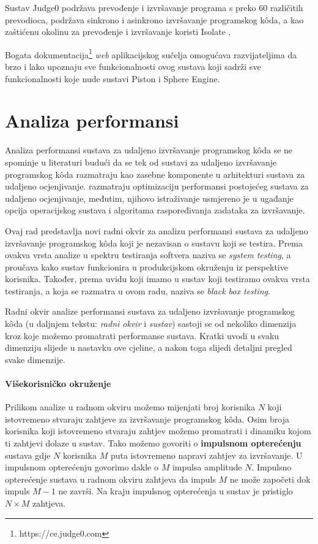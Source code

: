 \documentclass[times, utf8, diplomski]{fer}
\begin{document}
Sustav Judge0 podržava prevođenje i izvršavanje programa s preko 60 različitih prevodioca, podržava sinkrono i asinkrono izvršavanje programskog kôda, a kao zaštićenu okolinu za prevođenje i izvršavanje koristi Isolate \citep{marevs2012new}.

Bogata dokumentacija\footnote{https://ce.judge0.com} \textit{web} aplikacijskog sučelja omogućava razvijateljima da brzo i lako upoznaju sve funkcionalnosti ovog sustava koji sadrži sve funkcionalnosti koje nude sustavi Piston i Sphere Engine.

\chapter{Analiza performansi}
\label{chap:analysis}
Analiza performansi sustava za udaljeno izvršavanje programskog kôda se ne spominje u literaturi budući da se tek od \citep{9245310} sustavi za udaljeno izvršavanje programskog kôda razmatraju kao zasebne komponente u arhitekturi sustava za udaljeno ocjenjivanje.
\citep{drung2011enhance} razmatraju optimizaciju performansi postojećeg sustava za udaljeno ocjenjivanje, međutim, njihovo istraživanje usmjereno je u ugađanje opcija operacijskog sustava i algoritama raspoređivanja zadataka za izvršavanje.

Ovaj rad predstavlja novi radni okvir za analizu performansi sustava za udaljeno izvršavanje programskog kôda koji je nezavisan o sustavu koji se testira. Prema \citep{nidhra2012black} ovakva vrsta analize u spektru testiranja softvera naziva se \textit{system testing}, a proučava kako sustav funkcionira u produkcijskom okruženju iz perspektive korisnika. Također, prema uvidu koji imamo u sustav koji testiramo ovakva vrsta testiranja, a koja se razmatra u ovom radu, naziva se \textit{black box testing}.

Radni okvir analize performansi sustava za udaljeno izvršavanje programskog kôda (u daljnjem tekstu: \textit{radni okvir} i \textit{sustav}) sastoji se od nekoliko dimenzija kroz koje možemo promatrati performanse sustava. Kratki uvodi u svaku dimenziju slijede u nastavku ove cjeline, a nakon toga slijedi detaljni pregled svake dimenzije.

\subsubsection{Višekorisničko okruženje}
Prilikom analize u radnom okviru možemo mijenjati broj korisnika $N$ koji istovremeno stvaraju zahtjeve za izvršavanje programskog kôda. Osim broja korisnika koji istovremeno stvaraju zahtjev možemo promatrati i dinamiku kojom ti zahtjevi dolaze u sustav. Tako možemo govoriti o \textbf{impulsnom opterećenju} sustava gdje $N$ korisnika $M$ puta istovremeno napravi zahtjev za izvršavanje. U impulsnom opterećenju govorimo dakle o $M$ impulsa amplitude $N$. Impulsno opterećenje sustava u radnom okviru zahtjeva da impuls $M$ ne može započeti dok impuls $M-1$ ne završi. Na kraju impulsnog opterećenja u sustav je pristiglo $N \times M$ zahtjeva.
\end{document}
